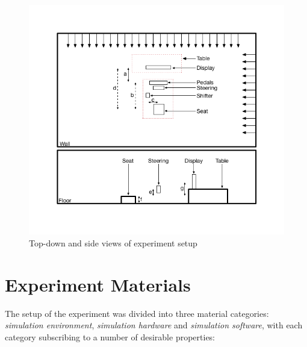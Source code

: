 \begin{figure}
	\centering
	\includegraphics[width=\textwidth]{images/experiment-setup-schematic.png}
	\caption[Experiment Setup Schematic]{Top-down and side views of experiment setup}
	\label{fig:meth-experiment-setup}
\end{figure}

\section{Experiment Materials}
\label{sec:meth-experiment-setup}
The setup of the experiment was divided into three material categories: \emph{simulation environment}, \emph{simulation hardware} and \emph{simulation software}, with each category subscribing to a number of desirable properties: 

